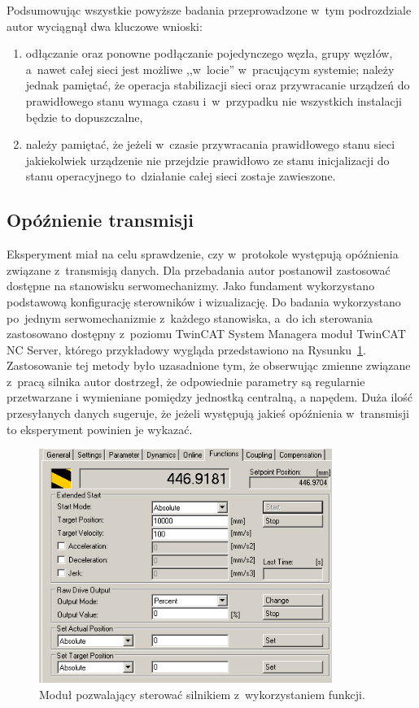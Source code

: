 Podsumowując wszystkie powyższe badania przeprowadzone w~tym podrozdziale autor wyciągnął dwa kluczowe wnioski:
\begin{enumerate}
\item odłączanie oraz ponowne podłączanie pojedynczego węzła, grupy węzłów, a~nawet całej sieci jest możliwe ,,w~locie'' w~pracującym systemie; należy jednak pamiętać, że operacja stabilizacji sieci oraz przywracanie urządzeń do prawidłowego stanu wymaga czasu i~w~przypadku nie wszystkich instalacji będzie to dopuszczalne,
\item należy pamiętać, że jeżeli w~czasie przywracania prawidłowego stanu sieci jakiekolwiek urządzenie nie przejdzie prawidłowo ze stanu inicjalizacji do stanu operacyjnego to~działanie całej sieci zostaje zawieszone.
\end{enumerate}
\subsection{Opóźnienie transmisji}
Eksperyment miał na celu sprawdzenie, czy w~protokole występują opóźnienia związane z~transmisją danych. Dla przebadania autor postanowił zastosować dostępne na stanowisku serwomechanizmy. Jako fundament wykorzystano podstawową konfigurację sterowników i wizualizację. Do badania wykorzystano po~jednym serwomechanizmie z~każdego stanowiska, a~do ich sterowania zastosowano dostępny z~poziomu TwinCAT System Managera moduł TwinCAT NC Server, którego przykładowy wygląda przedstawiono na Rysunku~\ref{axis_function}. Zastosowanie tej metody było uzasadnione tym, że obserwując zmienne związane z~pracą silnika autor dostrzegł, że odpowiednie parametry są regularnie przetwarzane i wymieniane pomiędzy jednostką centralną, a napędem. Duża ilość przesyłanych danych sugeruje, że jeżeli występują jakieś opóźnienia w~transmisji to eksperyment powinien je wykazać.

\begin{figure}[!htb] 	\centering 	\includegraphics[width=0.85\textwidth]{images/axis_function} \caption{Moduł pozwalający sterować silnikiem z~wykorzystaniem funkcji.} \label{axis_function} \end{figure}

